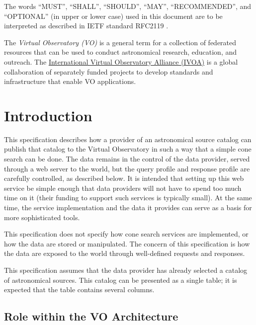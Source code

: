 \documentclass[11pt,a4paper]{ivoa}
\begin{document}
The words ``MUST'', ``SHALL'', ``SHOULD'', ``MAY'', ``RECOMMENDED'', and
``OPTIONAL'' (in upper or lower case) used in this document are to be
interpreted as described in IETF standard RFC2119 \citep{std:RFC2119}.

The \emph{Virtual Observatory (VO)} is a general term for a collection
of federated resources that can be used to conduct astronomical
research, education, and outreach.  The
\href{http://www.ivoa.net}{International Virtual Observatory Alliance
(IVOA)} is a global collaboration of separately funded projects to
develop standards and infrastructure that enable VO applications.


\section{Introduction}

This specification describes how a provider of an astronomical source
catalog can publish that catalog to the Virtual Observatory in such a
way that a simple cone search can be done. The data remains in the
control of the data provider, served through a web server to the world,
but the query profile and response profile are carefully controlled, as
described below. It is intended that setting up this web service be
simple enough that data providers will not have to spend too much time
on it (their funding to support such services is typically small). At
the same time, the service implementation and the data it provides can
serve as a basis for more sophisticated tools.

This specification does not specify how cone search services are
implemented, or how the data are stored or manipulated. The concern of
this specification is how the data are exposed to the world through
well-defined requests and responses.

This specification assumes that the data provider has already selected a
catalog of astronomical sources. This catalog can be presented as a
single table; it is expected that the table contains several columns.

\subsection{Role within the VO Architecture}
\end{document}
